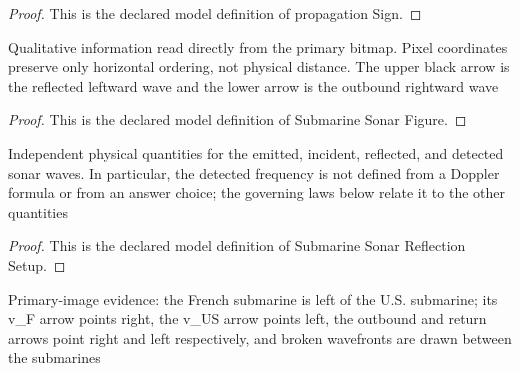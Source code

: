 \begin{proof}
  This is the declared model definition of propagation Sign.
\end{proof}
\begin{definition}
  \label{def:physics:phyx-mini-0319:phyxminiproblems-problemphyxmini0319-submarinesonarfigure}
  Qualitative information read directly from the primary bitmap. Pixel coordinates preserve only horizontal ordering, not physical distance. The upper black arrow is the reflected leftward wave and the lower arrow is the outbound rightward wave
\end{definition}
\begin{proof}
  This is the declared model definition of Submarine Sonar Figure.
\end{proof}
\begin{definition}
  \label{def:physics:phyx-mini-0319:phyxminiproblems-problemphyxmini0319-submarinesonarreflectionsetup}
  Independent physical quantities for the emitted, incident, reflected, and detected sonar waves. In particular, the detected frequency is not defined from a Doppler formula or from an answer choice; the governing laws below relate it to the other quantities
\end{definition}
\begin{proof}
  This is the declared model definition of Submarine Sonar Reflection Setup.
\end{proof}
\begin{definition}
  \label{def:physics:phyx-mini-0319:phyxminiproblems-problemphyxmini0319-matchesprimaryfigure}
  Primary-image evidence: the French submarine is left of the U.S. submarine; its v\_F arrow points right, the v\_US arrow points left, the outbound and return arrows point right and left respectively, and broken wavefronts are drawn between the submarines
\end{definition}
